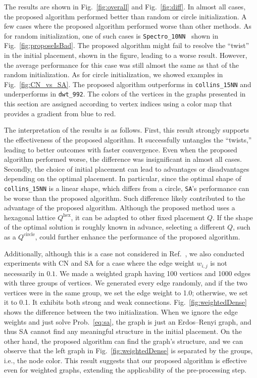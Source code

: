 \documentclass[dvipdfmx,10pt,journal,compsoc]{IEEEtran}
\begin{document}
The results are shown in Fig.~\ref{fig:overall} and Fig.~\ref{fig:diff}.
In almost all cases, the proposed algorithm performed better than random or circle initialization.
A few cases where the proposed algorithm performed worse than other methods.
As for random initialization, one of such cases is \texttt{Spectro\_10NN
} shown in Fig.~\ref{fig:proposeIsBad}. The proposed algorithm might fail to resolve the ``twist'' in the initial placement, shown in the figure, leading to a worse result. However, the average performance for this case was still almost the same as that of the random initialization.
As for circle initialization, we showed examples in Fig.~\ref{fig:CN_vs_SA}.
The proposed algorithm outperforms in \texttt{collins\_15NN} and underperforms in \texttt{dwt\_992}.
The colors of the vertices in the graphs presented in this section are assigned according to vertex indices using a color map that provides a gradient from blue to red.

The interpretation of the results is as follows.
First, this result strongly supports the effectiveness of the proposed algorithm. It successfully untangles the ``twists,'' leading to better outcomes with faster convergence. Even when the proposed algorithm performed worse, the difference was insignificant in almost all cases.
Secondly, the choice of initial placement can lead to advantages or disadvantages depending on the optimal placement.
In particular, since the optimal shape of \texttt{collins\_15NN} is a linear shape, which differs from a circle, \texttt{SA}'s performance can be worse than the proposed algorithm.
Such difference likely contributed to the advantage of the proposed algorithm.
Although the proposed method uses a hexagonal lattice $Q^\mathrm{hex}$, it can be adapted to other fixed placement $Q$.
If the shape of the optimal solution is roughly known in advance, selecting a different $Q$, such as a $Q^\mathrm{circle}$, could further enhance the performance of the proposed algorithm.

Additionally, although this is a case not considered in Ref.~\cite{ghassemitoosiSimulatedAnnealingPreProcessing2016}, we also conducted experiments with \textsf{CN} and \textsf{SA} for a case where the edge weight $w_{i,j}$ is not necessarily in $\qty{0,1}$.
We made a weighted graph having 100 vertices and 1000 edges with three groups of vertices.
We generated every edge randomly, and if the two vertices were in the same group, we set the edge weight to 1.0; otherwise, we set it to 0.1. It exhibits both strong and weak connections.
Fig.~\ref{fig:weightedDense} shows the difference between the two initialization.
When we ignore the edge weights and just solve Prob.~\eqref{eq:sa}, the graph is just an Erdos--Renyi graph, and thus \textsf{SA} cannot find any meaningful structure in the initial placement.
On the other hand, the proposed algorithm can find the graph's structure, and we can observe that the left graph in Fig.~\ref{fig:weightedDense} is separated by the groups, i.e., the node color.
This result suggests that our proposed algorithm is effective even for weighted graphs, extending the applicability of the pre-processing step.
\end{document}
